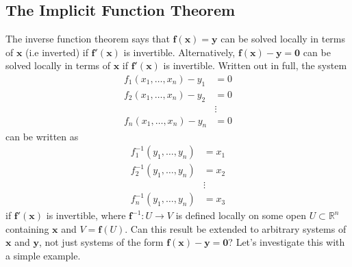 \documentclass{article}
\newcommand{\R}{\mathbb{R}}
\newcommand{\x}{\mathbf{x}}
\newcommand{\f}{\mathbf{f}}
\newcommand{\y}{\mathbf{y}}
\newcommand{\ze}{\mathbf{0}}
\theoremstyle{definition}
\begin{document}
\subsection{The Implicit Function Theorem}
The inverse function theorem says that $ \f(\x) = \y $ can be solved locally in terms of $ \x $ (i.e inverted) if $ \f'(\x) $ is invertible. Alternatively,  $ \f(\x) - \y = \ze $ can be solved locally in terms of $ \x $ if $ \f'(\x) $ is invertible. Written out in full, the system 
\begin{align*}
	f_1(x_1, \ldots, x_n)  - y_1 & = 0\\ 
	f_2(x_1, \ldots, x_n)  - y_2 & = 0\\
	&\vdots\\
	f_n(x_1, \ldots, x_n)  - y_n & = 0
\end{align*}
can be written as 
\begin{align*}
	f_1^{-1}(y_1, \ldots, y_n)   & = x_1\\ 
	f_2^{-1}(y_1, \ldots, y_n)   & = x_2\\
	&\vdots\\
	f_n^{-1}(y_1, \ldots, y_n)   & = x_3
\end{align*}
if $ \f'(\x) $ is invertible, where $ \f^{-1}:U\to V $ is defined locally on some open $ U\subset \R^n $ containing $ \x $ and $ V= \f(U) $. Can this result be extended to arbitrary systems of $ \x $ and $ \y $, not just systems of the form $ \f(\x)-\y = \ze $? Let's investigate this with a simple example.
\end{document}
